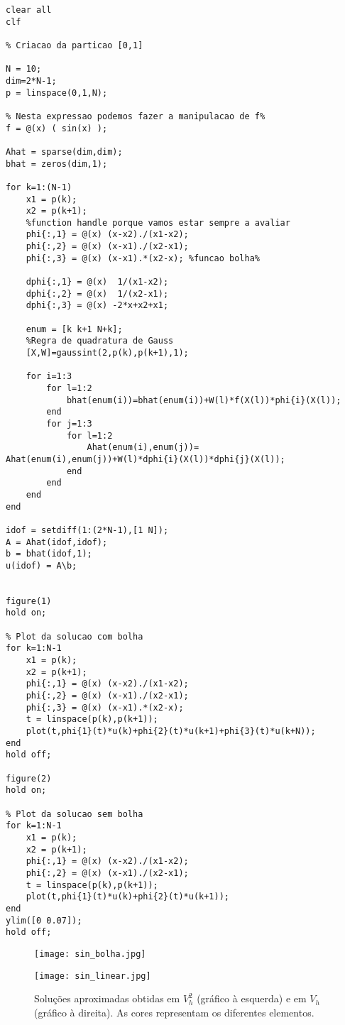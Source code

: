 \documentclass{article}
\theoremstyle{definition}
\theoremstyle{plain}
\numberwithin{equation}{section}
\begin{document}
\vspace{5mm}

\begin{lstlisting}[frame=single]
clear all
clf

% Criacao da particao [0,1]

N = 10;
dim=2*N-1;
p = linspace(0,1,N);

% Nesta expressao podemos fazer a manipulacao de f%
f = @(x) ( sin(x) );

Ahat = sparse(dim,dim);
bhat = zeros(dim,1);

for k=1:(N-1)
    x1 = p(k);
    x2 = p(k+1);
    %function handle porque vamos estar sempre a avaliar
    phi{:,1} = @(x) (x-x2)./(x1-x2);
    phi{:,2} = @(x) (x-x1)./(x2-x1);
    phi{:,3} = @(x) (x-x1).*(x2-x); %funcao bolha%

    dphi{:,1} = @(x)  1/(x1-x2);
    dphi{:,2} = @(x)  1/(x2-x1);
    dphi{:,3} = @(x) -2*x+x2+x1;

    enum = [k k+1 N+k];
    %Regra de quadratura de Gauss
    [X,W]=gaussint(2,p(k),p(k+1),1);

    for i=1:3
        for l=1:2
            bhat(enum(i))=bhat(enum(i))+W(l)*f(X(l))*phi{i}(X(l));
        end
        for j=1:3
            for l=1:2
                Ahat(enum(i),enum(j))= Ahat(enum(i),enum(j))+W(l)*dphi{i}(X(l))*dphi{j}(X(l));
            end
        end
    end
end

idof = setdiff(1:(2*N-1),[1 N]);
A = Ahat(idof,idof);
b = bhat(idof,1);
u(idof) = A\b;


figure(1)
hold on;

% Plot da solucao com bolha
for k=1:N-1
    x1 = p(k);
    x2 = p(k+1);
    phi{:,1} = @(x) (x-x2)./(x1-x2);
    phi{:,2} = @(x) (x-x1)./(x2-x1);
    phi{:,3} = @(x) (x-x1).*(x2-x);
    t = linspace(p(k),p(k+1));
    plot(t,phi{1}(t)*u(k)+phi{2}(t)*u(k+1)+phi{3}(t)*u(k+N));
end
hold off;

figure(2)
hold on;

% Plot da solucao sem bolha
for k=1:N-1
    x1 = p(k);
    x2 = p(k+1);
    phi{:,1} = @(x) (x-x2)./(x1-x2);
    phi{:,2} = @(x) (x-x1)./(x2-x1);
    t = linspace(p(k),p(k+1));
    plot(t,phi{1}(t)*u(k)+phi{2}(t)*u(k+1));
end
ylim([0 0.07]);
hold off;
\end{lstlisting}

\vspace{5mm}

\begin{figure} [H]
\centering
\begin{minipage}{0.5\textwidth}
  \centering
  \texttt{[image: sin\_bolha.jpg]}
\end{minipage}%
\begin{minipage}{0.5\textwidth}
  \centering
  \texttt{[image: sin\_linear.jpg]}
\end{minipage}
\caption{Soluções aproximadas obtidas em $V_h^2$ (gráfico à esquerda) e em $V_h$ (gráfico à direita). As cores representam os diferentes elementos.}
\end{figure}
\end{document}
